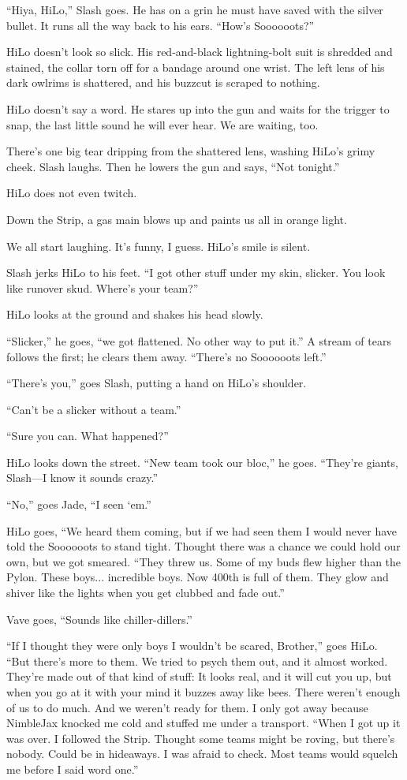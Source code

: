 ``Hiya, HiLo,'' Slash goes. He has on a grin he must have saved with the silver bullet. It runs all the way back to his ears. ``How's Soooooots?''

HiLo doesn't look so slick. His red-and-black lightning-bolt suit is shredded and stained, the collar torn off for a bandage around one wrist. The left lens of his dark owlrims is shattered, and his buzzcut is scraped to nothing.

HiLo doesn't say a word. He stares up into the gun and waits for the trigger to snap, the last little sound he will ever hear. We are waiting, too.

There's one big tear dripping from the shattered lens, washing HiLo's grimy cheek. Slash laughs. Then he lowers the gun and says, ``Not tonight.''

HiLo does not even twitch.

Down the Strip, a gas main blows up and paints us all in orange light.

We all start laughing. It's funny, I guess. HiLo's smile is silent.

Slash jerks HiLo to his feet. ``I got other stuff under my skin, slicker. You look like runover skud. Where's your team?''

HiLo looks at the ground and shakes his head slowly.

``Slicker,'' he goes, ``we got flattened. No other way to put it.'' A stream of tears follows the first; he clears them away. ``There's no Soooooots left.''

``There's you,'' goes Slash, putting a hand on HiLo's shoulder.

``Can't be a slicker without a team.''

``Sure you can. What happened?''

HiLo looks down the street. ``New team took our bloc,'' he goes. ``They're giants, Slash—I know it sounds crazy.''

``No,'' goes Jade, ``I seen ‘em.''

HiLo goes, ``We heard them coming, but if we had seen them I would never have told the Soooooots to stand tight. Thought there was a chance we could hold our own, but we got smeared. ``They threw us. Some of my buds flew higher than the Pylon. These boys... incredible boys. Now 400th is full of them. They glow and shiver like the lights when you get clubbed and fade out.''

Vave goes, ``Sounds like chiller-dillers.''

``If I thought they were only boys I wouldn't be scared, Brother,'' goes HiLo. ``But there's more to them. We tried to psych them out, and it almost worked. They're made out of that kind of stuff: It looks real, and it will cut you up, but when you go at it with your mind it buzzes away like bees. There weren't enough of us to do much. And we weren't ready for them. I only got away because NimbleJax knocked me cold and stuffed me under a transport.
``When I got up it was over. I followed the Strip. Thought some teams might be roving, but there's nobody. Could be in hideaways. I was afraid to check. Most teams would squelch me before I said word one.''

